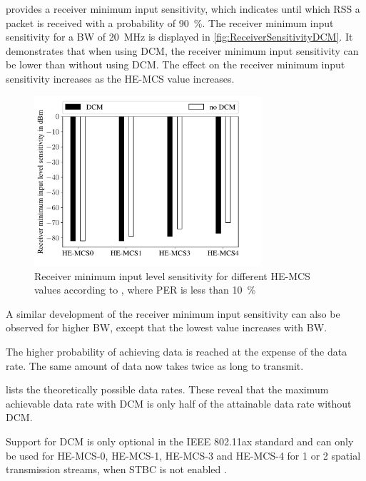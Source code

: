 \cite{ieee_standard_2021ax} provides a receiver minimum input sensitivity, which indicates until which \ac{RSS} a packet is
received with a probability of \SI{90}{\percent}.
The receiver minimum input sensitivity for a \ac{BW} of
\SI{20}{\mega\hertz} is displayed in \autoref{fig:ReceiverSensitivityDCM}.
It demonstrates that when using \ac{DCM},
the receiver minimum input sensitivity can be lower than without using \ac{DCM}.
The effect on the receiver minimum input sensitivity increases as the \ac{HE}-\ac{MCS} value increases.
\begin{figure}[H]%
	\centering
	\includegraphics[width=0.75\textwidth]{figures/Receiver_minimum_DCM}
	\caption{Receiver minimum input level sensitivity for different \ac{HE}-\ac{MCS} values according to \cite{ieee_standard_2021ax}, where \ac{PER} is less than \SI{10}{\percent}}%
	\label{fig:ReceiverSensitivityDCM}%
\end{figure}

A similar development of the receiver minimum input sensitivity can also be observed for higher \ac{BW}, except
that the lowest value increases with \ac{BW}.

The higher probability of achieving data is reached at the expense of the data rate.
The same amount of data now takes twice as long to transmit.

\cite{ieee_standard_2021ax} lists the theoretically possible data rates.
These reveal that the maximum achievable data rate with \ac{DCM} is only half of the attainable data rate without DCM.

Support for \ac{DCM} is only optional in the IEEE 802.11ax standard and can only be used for \ac{HE}-\ac{MCS}-\num{0},
\ac{HE}-\ac{MCS}-\num{1}, \ac{HE}-\ac{MCS}-\num{3} and \ac{HE}-\ac{MCS}-\num{4} for \num{1} or \num{2} spatial
transmission streams, when \ac{STBC} is not enabled \cite{ieee_standard_2021ax}.

